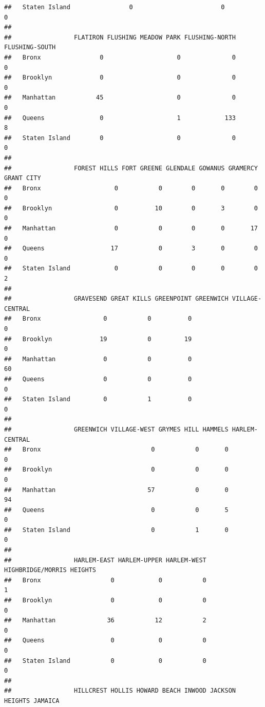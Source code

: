 \documentclass[
]{article}
\begin{document}
\begin{verbatim}
##   Staten Island                0                        0              0
##                
##                 FLATIRON FLUSHING MEADOW PARK FLUSHING-NORTH FLUSHING-SOUTH
##   Bronx                0                    0              0              0
##   Brooklyn             0                    0              0              0
##   Manhattan           45                    0              0              0
##   Queens               0                    1            133              8
##   Staten Island        0                    0              0              0
##                
##                 FOREST HILLS FORT GREENE GLENDALE GOWANUS GRAMERCY GRANT CITY
##   Bronx                    0           0        0       0        0          0
##   Brooklyn                 0          10        0       3        0          0
##   Manhattan                0           0        0       0       17          0
##   Queens                  17           0        3       0        0          0
##   Staten Island            0           0        0       0        0          2
##                
##                 GRAVESEND GREAT KILLS GREENPOINT GREENWICH VILLAGE-CENTRAL
##   Bronx                 0           0          0                         0
##   Brooklyn             19           0         19                         0
##   Manhattan             0           0          0                        60
##   Queens                0           0          0                         0
##   Staten Island         0           1          0                         0
##                
##                 GREENWICH VILLAGE-WEST GRYMES HILL HAMMELS HARLEM-CENTRAL
##   Bronx                              0           0       0              0
##   Brooklyn                           0           0       0              0
##   Manhattan                         57           0       0             94
##   Queens                             0           0       5              0
##   Staten Island                      0           1       0              0
##                
##                 HARLEM-EAST HARLEM-UPPER HARLEM-WEST HIGHBRIDGE/MORRIS HEIGHTS
##   Bronx                   0            0           0                         1
##   Brooklyn                0            0           0                         0
##   Manhattan              36           12           2                         0
##   Queens                  0            0           0                         0
##   Staten Island           0            0           0                         0
##                
##                 HILLCREST HOLLIS HOWARD BEACH INWOOD JACKSON HEIGHTS JAMAICA

\end{verbatim}
\end{document}
